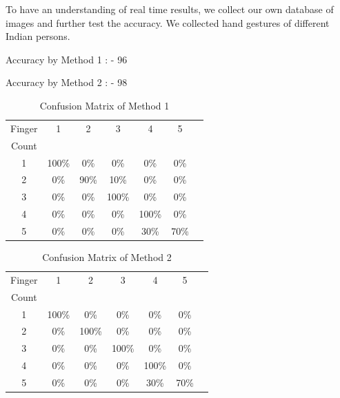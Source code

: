 \documentclass[conference]{IEEEtran}
\begin{document}
To have an understanding of real time results, we collect our own database of images and further test the accuracy. We collected hand gestures of different Indian persons.

Accuracy by Method 1 : - 96%

Accuracy by Method 2 : - 98%

\begin{table}[h!]
\caption{Confusion Matrix of Method 1}
\begin{center}
\begin{tabular}{|c|c|c|c|c|c|c|}
\hline
\multicolumn{1}{|c|}{Finger}
& \multicolumn{1}{|c|}{1}
& \multicolumn{1}{|c|}{2}
& \multicolumn{1}{|c|}{3}
& \multicolumn{1}{|c|}{4}
& \multicolumn{1}{|c|}{5}\\
Count &  &  &  &  &\\ \hline
1  &  100\%  &  0\%  & 0\%  & 0\% & 0\%\\ \hline
2  &  0\%  &  90\%  & 10\%  & 0\% & 0\%\\ \hline
3  &  0\%  &  0\%  & 100\%  & 0\% & 0\%\\ \hline
4  &  0\%  &  0\%  & 0\%  & 100\% & 0\%\\ \hline
5  &  0\%  &  0\%  & 0\%  & 30\% & 70\%\\ \hline
\end{tabular}
\label{table-tab2}
\end{center}
\end{table}

\begin{table}[h!]
\caption{Confusion Matrix of Method 2}
\begin{center}
\begin{tabular}{|c|c|c|c|c|c|c|}
\hline
\multicolumn{1}{|c|}{Finger}
& \multicolumn{1}{|c|}{1}
& \multicolumn{1}{|c|}{2}
& \multicolumn{1}{|c|}{3}
& \multicolumn{1}{|c|}{4}
& \multicolumn{1}{|c|}{5}\\
Count &  &  &  &  &\\ \hline
1  &  100\%  &  0\%  & 0\%  & 0\% & 0\%\\ \hline
2  &  0\%  &  100\%  & 0\%  & 0\% & 0\%\\ \hline
3  &  0\%  &  0\%  & 100\%  & 0\% & 0\%\\ \hline
4  &  0\%  &  0\%  & 0\%  & 100\% & 0\%\\ \hline
5  &  0\%  &  0\%  & 0\%  & 30\% & 70\%\\ \hline
\end{tabular}
\label{table-tab2}
\end{center}
\end{table}
\end{document}

